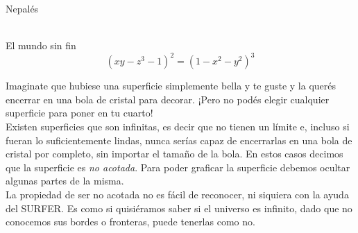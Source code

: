 \documentclass[es]{../../common/SurferDesc}%
\begin{document}
\footnotesize

\begin{surferPage}
  \begin{surferTitle}Nepalés\end{surferTitle}  \\
El mundo sin fin\\

\smallskip
\[(x y - z^3 -1)^2= (1 - x^2	- y^2)^3\]

\singlespacing
Imaginate que hubiese una superficie simplemente bella y te guste y la querés encerrar en una bola de cristal para decorar. ¡Pero no podés elegir cualquier superficie para poner en tu cuarto!
\\
\singlespacing
Existen superficies que son infinitas, es decir que no tienen un límite e, incluso si fueran lo suficientemente lindas, nunca serías capaz de encerrarlas en una bola de cristal por completo, sin importar el tamaño de la bola. En estos casos decimos que la superficie es \textit{no acotada}. Para poder graficar la superficie debemos ocultar algunas partes de la misma.
\\
\singlespacing
La propiedad de ser no acotada no es fácil de reconocer, ni siquiera con la ayuda del SURFER. Es como si quisiéramos saber si el universo es infinito, dado que no conocemos sus bordes o fronteras, puede tenerlas como no.
  \begin{surferText}
     \end{surferText}
\end{surferPage}
\end{document}
